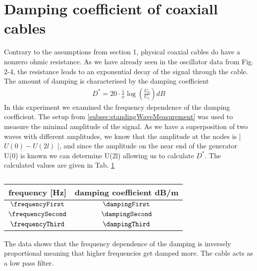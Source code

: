 \documentclass[a4paper,10pt,twocolumn]{article}
\begin{document}
    \section{Damping coefficient of coaxiall cables}\label{sec:dampingCoefficient}
    Contrary to the assumptions from section 1, physical coaxial cables do have a nonzero ohmic resistance.
    As we have already seen in the oscillator data from Fig. 2-4, the resistance leads to an exponential decay of the signal through the cable.
    The amount of damping is characterised by the damping coefficient
    \begin{align}
       D^* = 20\cdot \frac{1}{x}\log(\frac{U_0}{U_x}) dB 
    \end{align}
    In this experiment we examined the frequency dependence of the damping coefficient.
    The setup from \ref{subsec:standingWaveMeasurement} was used to measure the minimal amplitude of the signal.
    As we have a superposition of two waves with different amplitudes, we know that the amplitude at the nodes is | $U(0) - U(2l)$ |, and since the amplitude on the near end of the generator U(0) is known
    we can determine U(2l) allowing us to calculate $D^*$.
    The calculated values are given in Tab. \ref{tab:dampingData}
    \begin{table}
            \centering
            \caption{}
            \label{tab:dampingData}
            \begin{tabular*}{\linewidth}{@{\extracolsep{\fill}}cc}
    \hline  
    \hline
    \rule[-7pt]{0pt}{23pt}  frequency [Hz]& damping coefficient dB/m \\
    \hline
    \rule[-5pt]{0pt}{23pt}  $\frequencyFirst$ & $ \dampingFirst $ \\
    \rule[-5pt]{0pt}{23pt}  $\frequencySecond$ & $ \dampingSecond $ \\
    \rule[-5pt]{0pt}{23pt}  $\frequencyThird$ & $\dampingThird $ \\
    \hline
    \hline   
            \end{tabular*}
        \end{table}
    The data shows that the frequency dependence of the damping is inversely proportional meaning that higher frequencies get damped more.
    The cable acts as a low pass filter.
\end{document}
